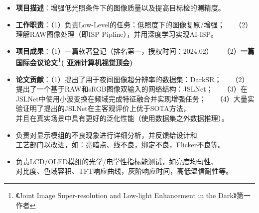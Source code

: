\documentclass[10pt,a4paper,ragged2e,withhyper]{altacv}
\begin{document}
\begin{paracol}{2}
\begin{itemize}
	\item \textbf{项目描述}：增强低光照条件下的图像质量以及提高目标检的测精度。
	\item \textbf{工作职责}：（1）负责Low-Level的任务：低照度下的图像复原/增强；
	$~~~~~$（2）理解RAW图像处理（即ISP Pipline），并用深度学习实现AI-ISP。
	\item \textbf{项目成果}：（1）一篇软著登记（排名第一，授权时间：2024.02）
	$~~~~~$（2）\textbf{一篇{\color{red}{~CCF-C~}}国际会议论文\footnote{《Joint Image Super-resolution and Low-light Enhancement in the Dark》第一作者}({\color{red}{ACCV 2024}} 亚洲计算机视觉顶会)}
	\item \textbf{论文贡献}：（1）提出了用于夜间图像超分辨率的数据集：DarkSR；
	$~~~~~$（2）提出了一个基于RAW和sRGB图像双输入的网络结构：JSLNet；
	$~~~~~$（3）在JSLNet中使用小波变换在频域完成特征融合并实现增强任务；
	$~~~~~$（4）大量实验证明了提出的JSLNet在主客观评价上优于SOTA方法，\\
  并且在真实场景中具有更好的泛化性能（使用数据集之外数据推理）。
\end{itemize}



\begin{itemize}
	\item 负责对显示模组的不良现象进行详细分析，并反馈给设计和\\
  工艺部门以改进，如：亮暗点、线不良，绑定不良，Flicker不良等。
	\item 负责LCD/OLED模组的光学/电学性指标能测试，如亮度均匀性、\\
	对比度、色域容积、TFT响应曲线，灰阶响应时间，高低温信耐性等。
\end{itemize}


\end{paracol}
\end{document}
